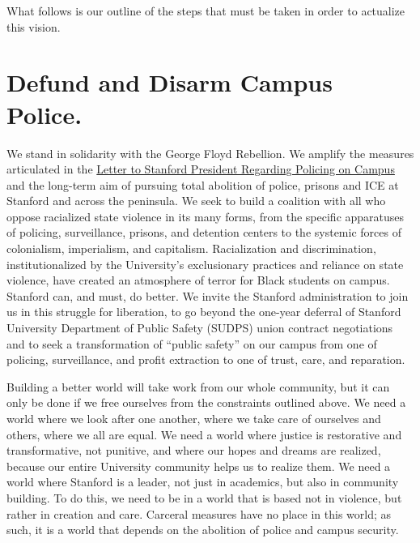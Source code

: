 \documentclass[12pt, titlepage, letterpaper]{article}
\begin{document}
\begin{center}What follows is our outline of the steps that must be taken in order to actualize this vision.\end{center}

\newpage

\tableofcontents

\newpage
\section*{Defund and Disarm Campus Police.}
\vspace{0.3em}
\hline\hline

We stand in solidarity with the George Floyd Rebellion. We amplify the measures articulated in the \href{https://docs.google.com/document/d/1clNfdcQWu4AHZ4HSB4x4dzddgpRXy_I3bJf9BTY3Adw/edit?usp=sharing}{Letter to Stanford President Regarding Policing on Campus} and the long-term aim of pursuing total abolition of police, prisons and ICE at Stanford and across the peninsula. We seek to build a coalition with all who oppose racialized state violence in its many forms, from the specific apparatuses of policing, surveillance, prisons, and detention centers to the systemic forces of colonialism, imperialism, and capitalism. Racialization and discrimination, institutionalized by the University’s exclusionary practices and reliance on state violence, have created an atmosphere of terror for Black students on campus. Stanford can, and must, do better. We invite the Stanford administration to join us in this struggle for liberation, to go beyond the one-year deferral of Stanford University Department of Public Safety (SUDPS) union contract negotiations and to seek a transformation of ``public safety” on our campus from one of policing, surveillance, and profit extraction to one of trust, care, and reparation.

Building a better world will take work from our whole community, but it can only be done if we free ourselves from the constraints outlined above. We need a world where we look after one another, where we take care of ourselves and others, where we all are equal. We need a world where justice is restorative and transformative, not punitive, and where our hopes and dreams are realized, because our entire University community helps us to realize them. We need a world where Stanford is a leader, not just in academics, but also in community building. To do this, we need to be in a world that is based not in violence, but rather in creation and care. Carceral measures have no place in this world; as such, it is a world that depends on the abolition of police and campus security.
\end{document}
